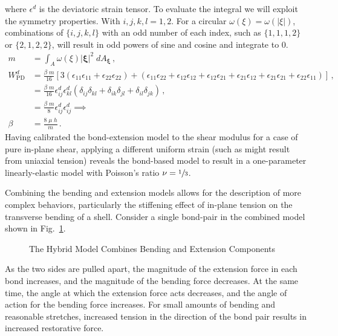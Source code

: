 %
where $\epsilon^d$ is the deviatoric strain tensor.  
To evaluate the integral we will exploit the symmetry properties. 
With $i, j, k, l = 1,2$. For a circular $\omega(\xi) = \omega(|\xi|)$, combinations of $\{i,j,k,l\}$ with an odd number of each index, such as $\{1,1,1,2\}$ or $\{2,1,2,2\}$, will result in odd powers of sine and cosine and integrate to 0.
%
\begin{align*}
    m &= \int_A \omega(\xi)|\boldsymbol{\xi}|^2\; dA_{\boldsymbol{\xi}}\, , \\
    W^d_\text{PD} &= \frac{\beta \; m}{16}[3(\epsilon_{11}\epsilon_{11}+\epsilon_{22}\epsilon_{22})+(\epsilon_{11}\epsilon_{22}+\epsilon_{12}\epsilon_{12}+\epsilon_{12}\epsilon_{21}+\epsilon_{21}\epsilon_{12}+\epsilon_{21}\epsilon_{21}+\epsilon_{22}\epsilon_{11})]\, ,\\
    &= \frac{\beta \; m}{16} \epsilon_{ij}^d \epsilon_{kl}^d (\delta_{ij}\delta_{kl}+\delta_{ik}\delta_{jl}+\delta_{il}\delta_{jk})\, ,\\
    &= \frac{\beta \; m}{8} \epsilon_{ij}^d \epsilon_{ij}^d \implies\\
     \beta &= \frac{8 \; \mu\;h}{m}\, .
\end{align*}
%
Having calibrated the bond-extension model to the shear modulus for a case of pure in-plane shear, applying a different uniform strain (such as might result from uniaxial tension) reveals the bond-based model to result in a one-parameter linearly-elastic model with Poisson's ratio \(\nu=\sfrac{1}{3}\).  

Combining the bending and extension models allows for the description of more complex behaviors, particularly the stiffening effect of in-plane tension on the transverse bending of a shell.  Consider a single bond-pair in the combined model shown in Fig.~\ref{fig:hybridmodel}.
%
\begin{figure}[htbp]
  \vspace{5mm}
  \centering
  
  \caption{The Hybrid Model Combines Bending and Extension Components}
  \label{fig:hybridmodel}
\end{figure}
%
As the two sides are pulled apart, the magnitude of the extension force in each bond increases, and the magnitude of the bending force decreases.  At the same time, the angle at which the extension force acts decreases, and the angle of action for the bending force increases.  For small amounts of bending and reasonable stretches, increased tension in the direction of the bond pair results in increased restorative force.
